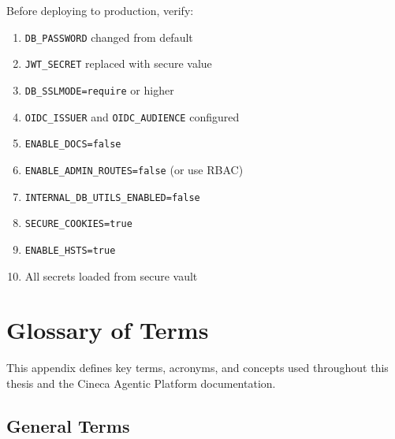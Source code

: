 \documentclass[a4paper,twoside]{sapthesis}
\begin{document}
Before deploying to production, verify:

\begin{enumerate}
    \item \texttt{DB\_PASSWORD} changed from default
    \item \texttt{JWT\_SECRET} replaced with secure value
    \item \texttt{DB\_SSLMODE=require} or higher
    \item \texttt{OIDC\_ISSUER} and \texttt{OIDC\_AUDIENCE} configured
    \item \texttt{ENABLE\_DOCS=false}
    \item \texttt{ENABLE\_ADMIN\_ROUTES=false} (or use RBAC)
    \item \texttt{INTERNAL\_DB\_UTILS\_ENABLED=false}
    \item \texttt{SECURE\_COOKIES=true}
    \item \texttt{ENABLE\_HSTS=true}
    \item All secrets loaded from secure vault
\end{enumerate}


\chapter{Glossary of Terms}
\label{app:glossary}

This appendix defines key terms, acronyms, and concepts used throughout this thesis and the Cineca Agentic Platform documentation.

\section{General Terms}
\label{app:glossary:general}
\end{document}
